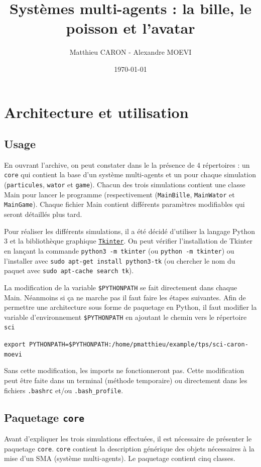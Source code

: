 \documentclass[a4paper]{article}
\title{Systèmes multi-agents : la bille, le poisson et l'avatar}
\author{Matthieu CARON - Alexandre MOEVI}
\date{\today}
\begin{document}
\maketitle

\section{Architecture et utilisation}

\subsection{Usage}

En ouvrant l'archive, on peut constater dans le la présence de 4 répertoires : un \texttt{core} qui contient la base d'un système multi-agents et un pour chaque simulation (\texttt{particules}, \texttt{wator} et \texttt{game}). Chacun des trois simulations contient une classe Main pour lancer le programme (respectivement (\texttt{MainBille}, \texttt{MainWator} et \texttt{MainGame}). Chaque fichier Main contient différents paramètres modifiables qui seront détaillés plus tard.

\medskip
Pour réaliser les différents simulations, il a été décidé d'utiliser la langage Python 3 et la bibliothèque graphique \href{https://wiki.python.org/moin/TkInter}{\texttt{Tkinter}}. On peut vérifier l'installation de Tkinter en lançant la commande \texttt{python3 -m tkinter} (ou \texttt{python -m tkinter}) ou l'installer avec \texttt{sudo apt-get install python3-tk} (ou chercher le nom du paquet avec \texttt{sudo apt-cache search tk}).

\medskip
La modification de la variable \texttt{\$PYTHONPATH} se fait directement dans chaque Main. Néanmoins si ça ne marche pas il faut faire les étapes suivantes.
Afin de permettre une architecture sous forme de paquetage en Python, il faut modifier la variable d'environnement \texttt{\$PYTHONPATH} en ajoutant le chemin vers le répertoire \texttt{sci} 

\medskip
\texttt{export PYTHONPATH=\$PYTHONPATH:/home/pmatthieu/example/tps/sci-caron-moevi}

\medskip
Sans cette modification, les imports ne fonctionneront pas. Cette modification peut être faite dans un terminal (méthode temporaire) ou directement dans les fichiers \texttt{.bashrc} et/ou \texttt{.bash\_profile}.
\newpage
\subsection{Paquetage \texttt{core}}
Avant d'expliquer les trois simulations effectuées, il est nécessaire de présenter le paquetage \texttt{core}. \texttt{core} contient la description générique des objets nécessaires à la mise d'un SMA (système multi-agents). Le paquetage contient cinq classes.
 
\end{document}
